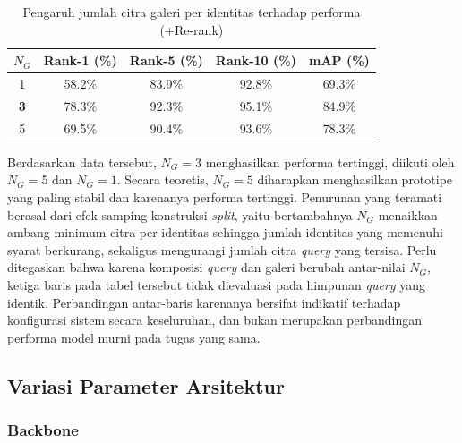 \begin{table}[H]
    \centering
    \caption{Pengaruh jumlah citra galeri per identitas terhadap performa (+Re-rank)}
    \label{tab:var_ngallery}
    \renewcommand{\arraystretch}{1.25}
    \begin{tabular}{ccccc}
        \hline
        $N_G$      & \textbf{Rank-1 (\%)} & \textbf{Rank-5 (\%)} & \textbf{Rank-10 (\%)} & \textbf{mAP (\%)} \\
        \hline
        1          & 58.2\%               & 83.9\%               & 92.8\%                & 69.3\%            \\
        \textbf{3} & 78.3\%               & 92.3\%               & 95.1\%                & 84.9\%            \\
        5          & 69.5\%               & 90.4\%               & 93.6\%                & 78.3\%            \\
        \hline
    \end{tabular}
\end{table}

Berdasarkan data tersebut, $N_G=3$ menghasilkan performa tertinggi, diikuti oleh $N_G=5$ dan $N_G=1$. Secara teoretis, $N_G=5$ diharapkan menghasilkan prototipe yang paling stabil dan karenanya performa tertinggi. Penurunan yang teramati berasal dari efek samping konstruksi \textit{split}, yaitu bertambahnya $N_G$ menaikkan ambang minimum citra per identitas sehingga jumlah identitas yang memenuhi syarat berkurang, sekaligus mengurangi jumlah citra \textit{query} yang tersisa. Perlu ditegaskan bahwa karena komposisi \textit{query} dan galeri berubah antar-nilai $N_G$, ketiga baris pada tabel tersebut tidak dievaluasi pada himpunan \textit{query} yang identik. Perbandingan antar-baris karenanya bersifat indikatif terhadap konfigurasi sistem secara keseluruhan, dan bukan merupakan perbandingan performa model murni pada tugas yang sama.

\subsection{Variasi Parameter Arsitektur}

\subsubsection{Backbone}

